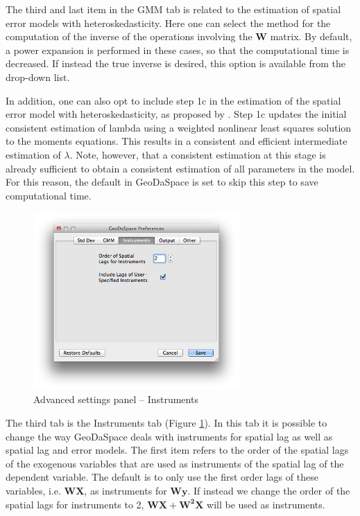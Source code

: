 \documentclass{article}
\begin{document}
The third and last item in the GMM tab is related to the estimation of spatial error models with heteroskedasticity. Here one can select the method for the computation of the inverse of the operations involving the $\mathbf{W}$ matrix. By default, a power expansion is performed in these cases, so that the computational time is decreased. If instead the true inverse is desired, this option is available from the drop-down list. 

In addition, one can also opt to include step 1c in the estimation of the spatial error model with heteroskedasticity, as proposed by \citet{Arraiz10}. Step 1c updates the initial consistent estimation of lambda using a weighted nonlinear least squares solution to the moments equations. This results in a consistent and efficient intermediate estimation of $\lambda$. Note, however, that a consistent estimation at this stage is already sufficient to obtain a consistent estimation of all parameters in the model. For this reason, the default in GeoDaSpace is set to skip this step to save computational time.
\FloatBarrier

\begin{figure}[htb]
\centering
\includegraphics[width=0.7\textwidth]{adv_inst.png}
\caption{Advanced settings panel -- Instruments}
\label{f:adv_inst}
\end{figure}

The third tab is the Instruments tab (Figure \ref{f:adv_inst}). In this tab it is possible to change the way GeoDaSpace deals with instruments for spatial lag as well as spatial lag and error models. The first item refers to the order of the spatial lags of the exogenous variables that are used as instruments of the spatial lag of the dependent variable. The default is to only use the first order lags of these variables, i.e. $\mathbf{WX}$, as instruments for $\mathbf{Wy}$. If instead we change the order of the spatial lags for instruments to 2, $\mathbf{WX}+ \mathbf{W^2X}$ will be used as instruments. 
\end{document}
